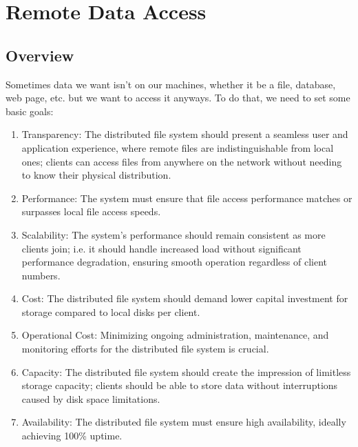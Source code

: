 \documentclass{report}
\begin{document}
\chapter{Remote Data Access}
\section{Overview}
Sometimes data we want isn't on our machines, whether it be a file, database, web page, etc. but we
want to access it anyways. To do that, we need to set some basic goals:

\begin{enumerate}[label=\textit{(\roman*)}]
\item Transparency: The distributed file system should present a seamless user and application
  experience, where remote files are indistinguishable from local ones; clients can access files
  from anywhere on the network without needing to know their physical distribution.
\item Performance: The system must ensure that file access performance matches or surpasses local
  file access speeds.
\item Scalability: The system's performance should remain consistent as more clients join; i.e. it
should handle increased load without significant performance degradation, ensuring smooth operation
regardless of client numbers.
\item Cost: The distributed file system should demand lower capital investment for storage compared
  to local disks per client.
\item Operational Cost: Minimizing ongoing administration, maintenance, and monitoring efforts for
  the distributed file system is crucial.
\item Capacity: The distributed file system should create the impression of limitless storage
  capacity; clients should be able to store data without interruptions caused by disk space
  limitations.
\item Availability: The distributed file system must ensure high availability, ideally achieving
  100\% uptime.
\end{enumerate}
\end{document}
